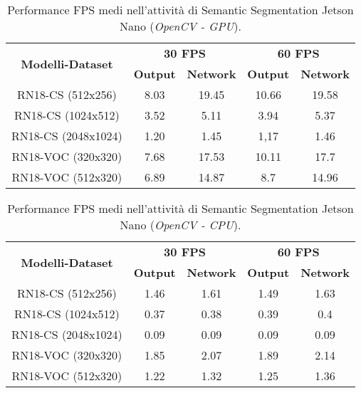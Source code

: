\begin{table}
    \renewcommand{\baselinestretch}{1}
    \centering
    \begin{adjustbox}{max width=\textwidth}
    \begin{tabular}{|c||c|c||c|c||}
        \hline
        \multirow{2}{*}{\bfseries{\Large Modelli-Dataset}} & \multicolumn{2}{c||}{\bfseries{30 FPS}} & \multicolumn{2}{c||}{\bfseries{60 FPS}}\\            & \bfseries{Output} & \bfseries{Network} & \bfseries{Output} & \bfseries{Network}\\
        \hline
        \hline
        RN18-CS (512x256) & 8.03 & 19.45 & 10.66 & 19.58\\
        \hline
        RN18-CS (1024x512) & 3.52 & 5.11 & 3.94 & 5.37\\
        \hline 
        RN18-CS (2048x1024) & 1.20 & 1.45 & 1,17 & 1.46\\
        \hline
        RN18-VOC (320x320) & 7.68 &  17.53 & 10.11 & 17.7\\
        \hline
        RN18-VOC (512x320) & 6.89 & 14.87 & 8.7 & 14.96\\
        \hline
    \end{tabular}
    \end{adjustbox}
    \vspace{0.5cm}
    \caption{Performance FPS medi nell'attività di Semantic Segmentation Jetson Nano (\emph{OpenCV - GPU}).}
    \label{average performance jetson opencv GPU sem_seg}
\end{table}

\begin{table}
    \renewcommand{\baselinestretch}{1}
    \centering
    \begin{adjustbox}{max width=\textwidth}
    \begin{tabular}{|c||c|c||c|c||}
        \hline
        \multirow{2}{*}{\bfseries{\Large Modelli-Dataset}} & \multicolumn{2}{c||}{\bfseries{30 FPS}} & \multicolumn{2}{c||}{\bfseries{60 FPS}}\\            & \bfseries{Output} & \bfseries{Network} & \bfseries{Output} & \bfseries{Network}\\
        \hline
        \hline
        RN18-CS (512x256) & 1.46 & 1.61 & 1.49 & 1.63\\
        \hline
        RN18-CS (1024x512) & 0.37 & 0.38 & 0.39 & 0.4\\
        \hline 
        RN18-CS (2048x1024) & 0.09 & 0.09 & 0.09 & 0.09\\
        \hline
        RN18-VOC (320x320) & 1.85 &  2.07 & 1.89 & 2.14\\
        \hline
        RN18-VOC (512x320) & 1.22 & 1.32 & 1.25 & 1.36\\
        \hline
    \end{tabular}
    \end{adjustbox}
    \vspace{0.5cm}
    \caption{Performance FPS medi nell'attività di Semantic Segmentation Jetson Nano (\emph{OpenCV - CPU}).}
    \label{average performance jetson opencv CPU sem_seg}
\end{table}

